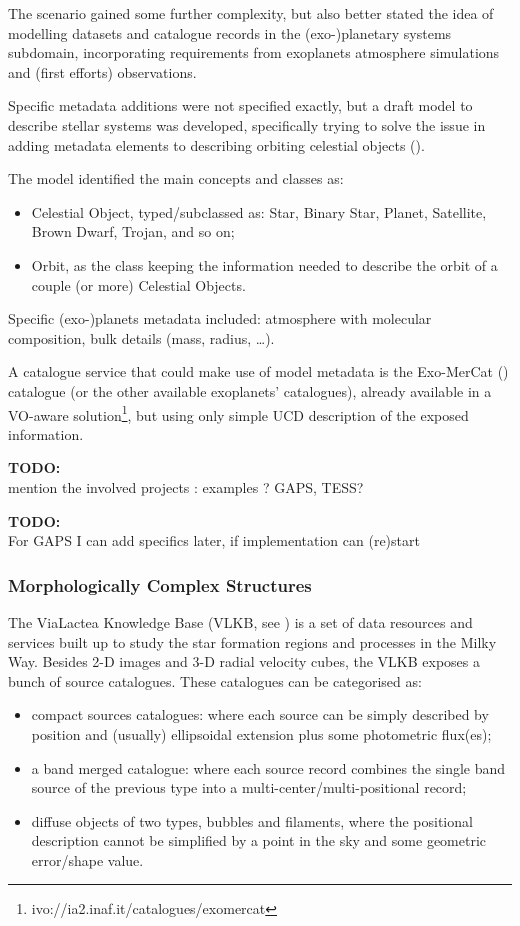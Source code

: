 \documentclass[11pt,a4paper]{ivoa}
\newcommand{\TODO}[1]{%
    \noindent%
    \colorbox{todocolor}{%
            \parbox{0.85\linewidth}{\sffamily \textbf{TODO:}\\
            #1}
    }%
    \vspace{2pt}

}
\begin{document}
The scenario gained some further complexity, but also better stated the
idea of modelling datasets and catalogue records in the (exo-)planetary
systems subdomain, incorporating requirements from exoplanets atmosphere
simulations and (first efforts) observations.

Specific metadata additions were not specified exactly, but a draft model
to describe stellar systems was developed, specifically trying to solve
the issue in adding metadata elements to describing orbiting celestial
objects (\cite{2019ASPC..523..597M}).

The model identified the main concepts and classes as:
\begin{itemize}
	\item Celestial Object, typed/subclassed as: Star, Binary Star,
Planet, Satellite, Brown Dwarf, Trojan, and so on;
	\item Orbit, as the class keeping the information needed to describe
the orbit of a couple (or more) Celestial Objects.
\end{itemize}

Specific (exo-)planets metadata included: atmosphere with molecular
composition, bulk details (mass, radius, \ldots).

A catalogue service that could make use of model metadata is the
Exo-MerCat (\cite{2020A&C....3100370A}) catalogue (or the other available exoplanets'
catalogues), already available in a VO-aware
solution\footnote{ivo://ia2.inaf.it/catalogues/exomercat}, but using only
simple UCD description of the exposed information.

\TODO{mention the involved projects : examples ? GAPS, TESS? }
\TODO{For GAPS I can add specifics later, if implementation can
(re)start}

\subsubsection{Morphologically Complex Structures}
The ViaLactea Knowledge Base (VLKB, see \cite{2016SPIE.9913E..0HM}) is a set of data
resources and services built up to study the star formation regions and
processes in the Milky Way. Besides 2-D images and 3-D radial velocity
cubes, the VLKB exposes a bunch of source catalogues. These catalogues
can be categorised as:

\begin{itemize}
	\item compact sources catalogues: where each source can be simply
described by position and (usually) ellipsoidal extension plus some
photometric flux(es);
	\item a band merged catalogue: where each source record combines the
single band source of the previous type into a
multi-center/multi-positional record;
	\item diffuse objects of two types, bubbles and filaments, where the
positional description cannot be simplified by a point in the sky and
some geometric error/shape value.
\end{itemize}
\end{document}
